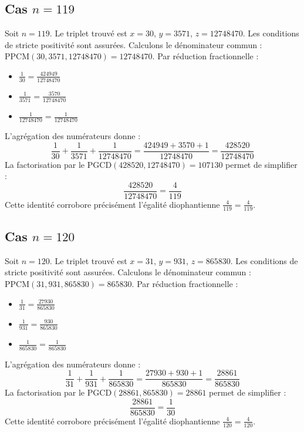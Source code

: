 \documentclass[11pt,a4paper]{article}
\begin{document}
\subsection{Cas $n = 119$}
Soit $n = 119$. Le triplet trouvé est $x = 30$, $y = 3571$, $z = 12748470$.
Les conditions de stricte positivité sont assurées.
Calculons le dénominateur commun : $\text{PPCM}(30, 3571, 12748470) = 12748470$.
Par réduction fractionnelle :
\begin{itemize}
    \item $\frac{1}{30} = \frac{424949}{12748470}$
    \item $\frac{1}{3571} = \frac{3570}{12748470}$
    \item $\frac{1}{12748470} = \frac{1}{12748470}$
\end{itemize}
L'agrégation des numérateurs donne :
$$ \frac{1}{30} + \frac{1}{3571} + \frac{1}{12748470} = \frac{424949 + 3570 + 1}{12748470} = \frac{428520}{12748470} $$
La factorisation par le $\text{PGCD}(428520, 12748470) = 107130$ permet de simplifier :
$$ \frac{428520}{12748470} = \frac{4}{119} $$
Cette identité corrobore précisément l'égalité diophantienne $\frac{4}{119} = \frac{4}{119}$.

\subsection{Cas $n = 120$}
Soit $n = 120$. Le triplet trouvé est $x = 31$, $y = 931$, $z = 865830$.
Les conditions de stricte positivité sont assurées.
Calculons le dénominateur commun : $\text{PPCM}(31, 931, 865830) = 865830$.
Par réduction fractionnelle :
\begin{itemize}
    \item $\frac{1}{31} = \frac{27930}{865830}$
    \item $\frac{1}{931} = \frac{930}{865830}$
    \item $\frac{1}{865830} = \frac{1}{865830}$
\end{itemize}
L'agrégation des numérateurs donne :
$$ \frac{1}{31} + \frac{1}{931} + \frac{1}{865830} = \frac{27930 + 930 + 1}{865830} = \frac{28861}{865830} $$
La factorisation par le $\text{PGCD}(28861, 865830) = 28861$ permet de simplifier :
$$ \frac{28861}{865830} = \frac{1}{30} $$
Cette identité corrobore précisément l'égalité diophantienne $\frac{4}{120} = \frac{4}{120}$.
\end{document}

